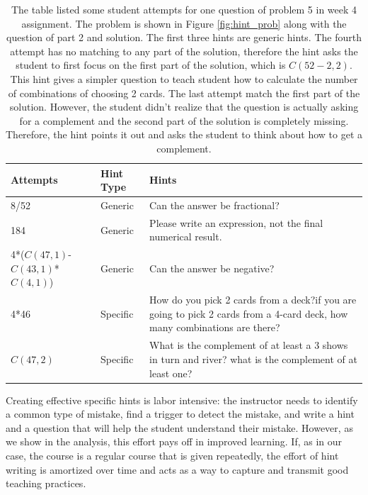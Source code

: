 \documentclass{llncs2e/llncs}
\begin{document}
\begin{table}[h]
\caption{The table listed some student attempts for one question of
  problem 5 in week 4 assignment. The problem is shown in Figure
  \ref{fig:hint_prob} along with the question of part 2 and
  solution. The first three hints are generic hints. The fourth
  attempt has no matching to any part of the solution, therefore the
  hint asks the student to first focus on the first part of the
  solution, which is $C(52-2,2)$. This hint gives a simpler question
  to teach student how to calculate the number of combinations of
  choosing 2 cards. The last attempt match the first part of the
  solution. However, the student didn't realize that the question is
  actually asking for a complement and the second part of the solution
  is completely missing. Therefore, the hint points it out and asks
  the student to think about how to get a complement.}
\begin{center}
  \begin{tabular}{ p{2.5cm}  p{1.5cm}  p{6cm} }
    Attempts & Hint Type & Hints \\ \hline
    8/52 & Generic & Can the answer be fractional? \\ \hline
    184 & Generic & Please write an expression, not the final numerical result. \\ \hline
    4*($C(47,1)$-$C(43,1)$*$C(4,1)$) & Generic & Can the answer be negative? \\ \hline
   4*46 & Specific & How do you pick 2 cards from a deck?if you are going to pick 2 cards from a 4-card deck, how many combinations are there? \\ \hline
   $C(47,2)$ & Specific & What is the complement of at least a 3 shows in turn and river? what is the complement of at least one? \\
  \end{tabular}
  \label{tab:hints_sent}
  \end{center}
\end{table}




Creating effective specific hints is labor intensive: the instructor needs
to identify a common type of mistake, find a trigger to detect the
mistake, and write a hint and a question that will help the student
understand their mistake. However, as we show in the analysis, this
effort pays off in improved learning. If, as in our case, the course
is a regular course that is given repeatedly, the effort of hint
writing is amortized over time and acts as a way to capture and
transmit good teaching practices.
\end{document}
